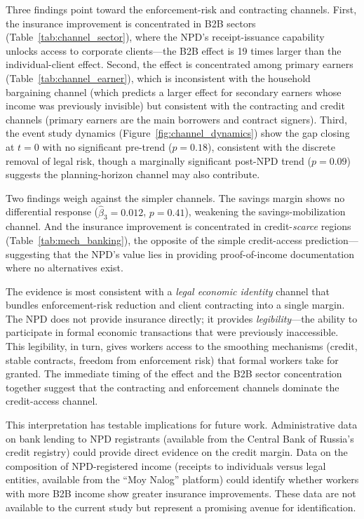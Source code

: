 \documentclass[12pt]{article}
\begin{document}
Three findings point toward the enforcement-risk and contracting channels. First, the insurance improvement is concentrated in B2B sectors (Table~\ref{tab:channel_sector}), where the NPD's receipt-issuance capability unlocks access to corporate clients---the B2B effect is 19 times larger than the individual-client effect. Second, the effect is concentrated among primary earners (Table~\ref{tab:channel_earner}), which is inconsistent with the household bargaining channel (which predicts a larger effect for secondary earners whose income was previously invisible) but consistent with the contracting and credit channels (primary earners are the main borrowers and contract signers). Third, the event study dynamics (Figure~\ref{fig:channel_dynamics}) show the gap closing at $t = 0$ with no significant pre-trend ($p = 0.18$), consistent with the discrete removal of legal risk, though a marginally significant post-NPD trend ($p = 0.09$) suggests the planning-horizon channel may also contribute.

Two findings weigh against the simpler channels. The savings margin shows no differential response ($\hat{\beta}_3 = 0.012$, $p = 0.41$), weakening the savings-mobilization channel. And the insurance improvement is concentrated in credit-\textit{scarce} regions (Table~\ref{tab:mech_banking}), the opposite of the simple credit-access prediction---suggesting that the NPD's value lies in providing proof-of-income documentation where no alternatives exist.

The evidence is most consistent with a \textit{legal economic identity} channel that bundles enforcement-risk reduction and client contracting into a single margin. The NPD does not provide insurance directly; it provides \textit{legibility}---the ability to participate in formal economic transactions that were previously inaccessible. This legibility, in turn, gives workers access to the smoothing mechanisms (credit, stable contracts, freedom from enforcement risk) that formal workers take for granted. The immediate timing of the effect and the B2B sector concentration together suggest that the contracting and enforcement channels dominate the credit-access channel.

This interpretation has testable implications for future work. Administrative data on bank lending to NPD registrants (available from the Central Bank of Russia's credit registry) could provide direct evidence on the credit margin. Data on the composition of NPD-registered income (receipts to individuals versus legal entities, available from the ``Moy Nalog'' platform) could identify whether workers with more B2B income show greater insurance improvements. These data are not available to the current study but represent a promising avenue for identification.
\end{document}
